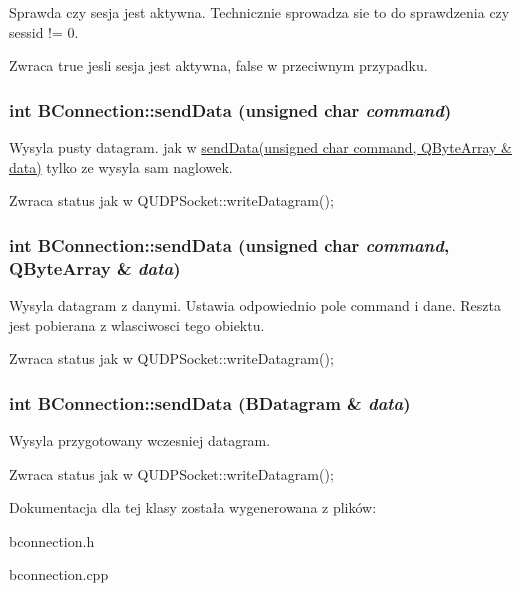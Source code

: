 Sprawda czy sesja jest aktywna. Technicznie sprowadza sie to do sprawdzenia czy sessid != 0.

\begin{DoxyReturn}{Zwraca}
true jesli sesja jest aktywna, false w przeciwnym przypadku. 
\end{DoxyReturn}
\hypertarget{class_b_connection_ae6e720ac6a03bd3672ab440eb1e9b8c5}{
\subsubsection[{sendData}]{\setlength{\rightskip}{0pt plus 5cm}int BConnection::sendData (unsigned char {\em command})}}
\label{class_b_connection_ae6e720ac6a03bd3672ab440eb1e9b8c5}


Wysyla pusty datagram. jak w \hyperlink{class_b_connection_a77f411c1ec683bd571f41023609f2e7f}{sendData(unsigned char command, QByteArray \& data)} tylko ze wysyla sam naglowek.

\begin{DoxyReturn}{Zwraca}
status jak w QUDPSocket::writeDatagram(); 
\end{DoxyReturn}
\hypertarget{class_b_connection_a77f411c1ec683bd571f41023609f2e7f}{
\subsubsection[{sendData}]{\setlength{\rightskip}{0pt plus 5cm}int BConnection::sendData (unsigned char {\em command}, \/  QByteArray \& {\em data})}}
\label{class_b_connection_a77f411c1ec683bd571f41023609f2e7f}


Wysyla datagram z danymi. Ustawia odpowiednio pole command i dane. Reszta jest pobierana z wlasciwosci tego obiektu.

\begin{DoxyReturn}{Zwraca}
status jak w QUDPSocket::writeDatagram(); 
\end{DoxyReturn}
\hypertarget{class_b_connection_a53b6835b9124709e108913103049910b}{
\subsubsection[{sendData}]{\setlength{\rightskip}{0pt plus 5cm}int BConnection::sendData ({\bf BDatagram} \& {\em data})}}
\label{class_b_connection_a53b6835b9124709e108913103049910b}


Wysyla przygotowany wczesniej datagram. \begin{DoxyReturn}{Zwraca}
status jak w QUDPSocket::writeDatagram(); 
\end{DoxyReturn}


Dokumentacja dla tej klasy została wygenerowana z plików:\begin{DoxyCompactItemize}
\item 
bconnection.h\item 
bconnection.cpp\end{DoxyCompactItemize}
